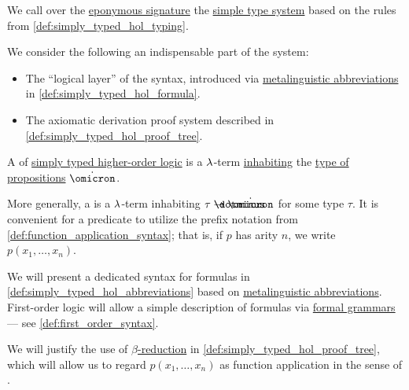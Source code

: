 \begin{definition}\label{def:simply_typed_hol}
  We call  over the \hyperref[def:simply_typed_hol_signature]{eponymous signature} the \hyperref[def:simple_type_system]{simple type system} based on the rules from \cref{def:simply_typed_hol_typing}.
\end{definition}
\begin{comments}
  \item We consider the following an indispensable part of the system:
  \begin{itemize}
    \item The \enquote{logical layer} of the syntax, introduced via \hyperref[con:metalingual_abbreviation]{metalinguistic abbreviations} in \cref{def:simply_typed_hol_formula}.
    \item The axiomatic derivation proof system described in \cref{def:simply_typed_hol_proof_tree}.
  \end{itemize}
\end{comments}

\begin{definition}\label{def:simply_typed_hol_formula}
  A  of \hyperref[def:simply_typed_hol]{simply typed higher-order logic} is a \( {\mathrm \lambda} \)-term \hyperref[def:type_habitation]{inhabiting} the \hyperref[def:simply_typed_hol_signature/types]{type of propositions} \( \syn\omicron \).

  More generally, a  is a \( {\mathrm \lambda} \)-term inhabiting \( \tau \synimplies \syn\omicron \) for some type \( \tau \). It is convenient for a predicate to utilize the prefix notation from \cref{def:function_application_syntax}; that is, if \( p \) has arity \( n \), we write \( p(x_1, \ldots, x_n) \).
\end{definition}
\begin{comments}
  \item We will present a dedicated syntax for formulas in \cref{def:simply_typed_hol_abbreviations} based on \hyperref[con:metalingual_abbreviation]{metalinguistic abbreviations}. First-order logic will allow a simple description of formulas via \hyperref[def:formal_grammar]{formal grammars} --- see \ref{def:first_order_syntax}.

  \item We will justify the use of \hyperref[def:beta_eta_reduction]{\( \beta \)-reduction} in \cref{def:simply_typed_hol_proof_tree}, which will allow us to regard \( p(x_1, \ldots, x_n) \) as function application in the sense of .
\end{comments}

